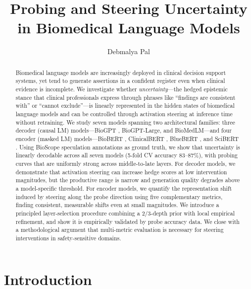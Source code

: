 \documentclass[11pt,a4paper]{article}
\title{Probing and Steering Uncertainty in Biomedical Language Models}
\author{Debmalya Pal}
\date{}
\begin{document}
\maketitle

\begin{abstract}
Biomedical language models are increasingly deployed in clinical decision
support systems, yet tend to generate assertions in a confident register
even when clinical evidence is incomplete. We investigate whether
\emph{uncertainty}---the hedged epistemic stance that clinical
professionals express through phrases like ``findings are consistent
with'' or ``cannot exclude''---is linearly represented in the hidden
states of biomedical language models and can be controlled through
activation steering at inference time without retraining. We study seven
models spanning two architectural families: three decoder (causal LM)
models---BioGPT \citep{luo2022biogpt}, BioGPT-Large, and BioMedLM---and
four encoder (masked LM) models---BioBERT \citep{lee2020biobert},
ClinicalBERT \citep{alsentzer2019clinicalbert}, BlueBERT
\citep{peng2019bluebert}, and SciBERT \citep{beltagy2019scibert}. Using
BioScope speculation annotations \citep{vincze2008bioscope} as ground
truth, we show that uncertainty is linearly decodable across all seven
models (5-fold CV accuracy 83--87\%), with probing curves that are
uniformly strong across middle-to-late layers. For decoder models, we
demonstrate that activation steering can increase hedge scores at low
intervention magnitudes, but the productive range is narrow and
generation quality degrades above a model-specific threshold. For encoder
models, we quantify the representation shift induced by steering along
the probe direction using five complementary metrics, finding consistent,
measurable shifts even at small magnitudes. We introduce a principled
layer-selection procedure combining a 2/3-depth prior with local
empirical refinement, and show it is empirically validated by probe
accuracy data. We close with a methodological argument that multi-metric
evaluation is necessary for steering interventions in safety-sensitive
domains.
\end{abstract}

\section{Introduction}
\end{document}

